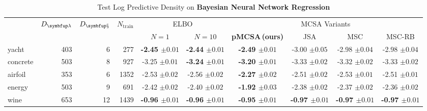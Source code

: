 
\begin{table*}[b]
  \vspace{-2ex}
  \centering
  \caption{Test Log Predictive Density on \textbf{Bayesian Neural Network Regression}}\label{table:bnn}
  \setlength{\tabcolsep}{2pt}
  \begin{threeparttable}
  \begin{tabular}{lrrrcccccc}
    \toprule
    & \multicolumn{1}{c}{\multirow{2}{*}{\(D_{\mathcal{\vlambda}}\)}} & \multicolumn{1}{c}{\multirow{2}{*}{\(D_{\mathcal{\vx}}\)}} &  \multicolumn{1}{c}{\multirow{2}{*}{\(N_{\text{train}}\)}} & \multicolumn{2}{c}{\multirow{1}{*}{ELBO}} & \multicolumn{4}{c}{MCSA Variants} \\\cmidrule(lr){5-6}\cmidrule(lr){7-10}
  & & & & {\footnotesize\(N=1\)} & {\footnotesize\(N=10\)} & \multicolumn{1}{c}{\multirow{1}{*}{\footnotesize{\textbf{pMCSA{\scriptsize\,(ours)}}}}} & \multicolumn{1}{c}{\multirow{1}{*}{\footnotesize{JSA}}} & \multicolumn{1}{c}{\multirow{1}{*}{\footnotesize{MSC}}} & \multicolumn{1}{c}{\multirow{1}{*}{\footnotesize{MSC-RB}}}\\
    \midrule
    \textsf{yacht} & 403 & 6 & 277 & {\bf-2.45 {\scriptsize{\(\pm 0.01\)}}} & {\bf-2.44 {\scriptsize{\(\pm 0.01\)}}} & {\bf-2.49 {\scriptsize{\(\pm 0.01\)}}} & {-3.00 {\scriptsize{\(\pm 0.05\)}}} & {-2.98 {\scriptsize{\(\pm 0.04\)}}} & {-2.98 {\scriptsize{\(\pm 0.04\)}}}\\
    \textsf{concrete} & 503 & 8 & 927 & {-3.25 {\scriptsize{\(\pm 0.01\)}}} & {\bf-3.24 {\scriptsize{\(\pm 0.01\)}}} & {\bf-3.20 {\scriptsize{\(\pm 0.01\)}}} & {-3.33 {\scriptsize{\(\pm 0.02\)}}} & {-3.32 {\scriptsize{\(\pm 0.02\)}}} & {-3.33 {\scriptsize{\(\pm 0.02\)}}}\\
    \textsf{airfoil} & 353 & 6 & 1352 & {-2.53 {\scriptsize{\(\pm 0.02\)}}} & {-2.56 {\scriptsize{\(\pm 0.02\)}}} & {\bf-2.27 {\scriptsize{\(\pm 0.02\)}}} & {-2.51 {\scriptsize{\(\pm 0.02\)}}} & {-2.53 {\scriptsize{\(\pm 0.01\)}}} & {-2.51 {\scriptsize{\(\pm 0.01\)}}}\\
    \textsf{energy} & 503 & 9 & 691 & {-2.42 {\scriptsize{\(\pm 0.02\)}}} & {-2.40 {\scriptsize{\(\pm 0.02\)}}} & {\bf-1.92 {\scriptsize{\(\pm 0.03\)}}} & {-2.38 {\scriptsize{\(\pm 0.02\)}}} & {-2.37 {\scriptsize{\(\pm 0.02\)}}} & {-2.36 {\scriptsize{\(\pm 0.02\)}}}\\
    \textsf{wine} & 653 & 12 & 1439 & {\bf-0.96 {\scriptsize{\(\pm 0.01\)}}} & {\bf-0.96 {\scriptsize{\(\pm 0.01\)}}} & {\bf-0.95 {\scriptsize{\(\pm 0.01\)}}} & {\bf-0.97 {\scriptsize{\(\pm 0.01\)}}} & {\bf-0.97 {\scriptsize{\(\pm 0.01\)}}} & {\bf-0.97 {\scriptsize{\(\pm 0.01\)}}} \\

\end{tabular}
\end{threeparttable}
\end{table*}
